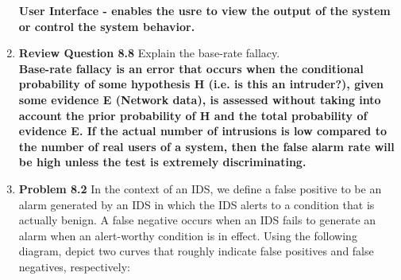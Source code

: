 \documentclass[12pt]{article}
\begin{document}
\begin{enumerate}
  \textbf{User Interface - enables the usre to view the output of the system or control the system behavior.} \\

  \item \textbf{Review Question 8.8} Explain the base-rate fallacy.\\

  \textbf{Base-rate fallacy is an error that occurs when the conditional probability of some hypothesis H (i.e. is this an intruder?), given some evidence E (Network data), is assessed without taking into account the prior probability of H and the total probability of evidence E. If the actual number of intrusions is low compared to the number of real users of a system, then the false alarm rate will be high unless the test is extremely discriminating.} \\

  \item \textbf{Problem 8.2} In the context of an IDS, we define a false positive to be an alarm generated by an IDS in which the IDS alerts to a condition that is actually benign. A false negative occurs when an IDS fails to generate an alarm when an alert-worthy condition is in effect. Using the following diagram, depict two curves that roughly indicate false positives and false negatives, respectively:\\

\end{enumerate}
\end{document}
